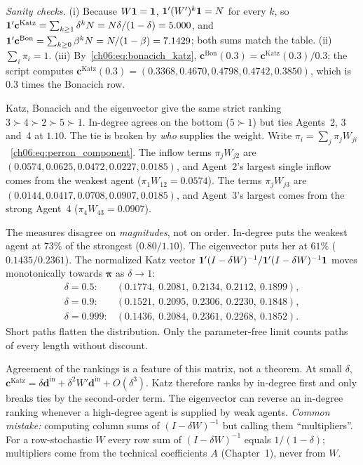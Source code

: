 \documentclass[../solutions_manual.tex]{subfiles}
\begin{document}
\emph{Sanity checks.} (i) Because $W\mathbf{1} = \mathbf{1}$, $\mathbf{1}'(W')^k\mathbf{1} = N$ for every $k$, so $\mathbf{1}'\mathbf{c}^{\text{Katz}} = \sum_{k \ge 1}\delta^k N = N\delta/(1-\delta) = 5.000$, and $\mathbf{1}'\mathbf{c}^{\text{Bon}} = \sum_{k\ge0}\beta^k N = N/(1-\beta) = 7.1429$; both sums match the table. (ii) $\sum_i \pi_i = 1$. (iii) By~\eqref{ch06:eq:bonacich_katz}, $\mathbf{c}^{\text{Bon}}(0.3) = \mathbf{c}^{\text{Katz}}(0.3)/0.3$; the script computes $\mathbf{c}^{\text{Katz}}(0.3) = (0.3368, 0.4670, 0.4798, 0.4742, 0.3850)$, which is $0.3$ times the Bonacich row.

 Katz, Bonacich and the eigenvector give the same strict ranking $3 \succ 4 \succ 2 \succ 5 \succ 1$. In-degree agrees on the bottom ($5 \succ 1$) but ties Agents~2, 3 and~4 at $1.10$. The tie is broken by \emph{who} supplies the weight. Write $\pi_i = \sum_j \pi_j W_{ji}$~\eqref{ch06:eq:perron_component}. The inflow terms $\pi_jW_{j2}$ are $(0.0574, 0.0625, 0.0472, 0.0227, 0.0185)$, and Agent~2's largest single inflow comes from the weakest agent ($\pi_1W_{12} = 0.0574$). The terms $\pi_jW_{j3}$ are $(0.0144, 0.0417, 0.0708, 0.0907, 0.0185)$, and Agent~3's largest comes from the strong Agent~4 ($\pi_4W_{43} = 0.0907$).

The measures disagree on \emph{magnitudes}, not on order. In-degree puts the weakest agent at $73\%$ of the strongest ($0.80/1.10$). The eigenvector puts her at $61\%$ ($0.1435/0.2361$). The normalized Katz vector $\mathbf{1}'(I - \delta W)^{-1}/\mathbf{1}'(I-\delta W)^{-1}\mathbf{1}$ moves monotonically towards $\boldsymbol{\pi}$ as $\delta \to 1$:
\[
\begin{array}{ll}
\delta = 0.5: & (0.1774,\ 0.2081,\ 0.2134,\ 0.2112,\ 0.1899),\\
\delta = 0.9: & (0.1521,\ 0.2095,\ 0.2306,\ 0.2230,\ 0.1848),\\
\delta = 0.999: & (0.1436,\ 0.2084,\ 0.2361,\ 0.2268,\ 0.1852).
\end{array}
\] Short paths flatten the distribution. Only the parameter-free limit counts paths of every length without discount.

Agreement of the rankings is a feature of this matrix, not a theorem. At small $\delta$, $\mathbf{c}^{\text{Katz}} = \delta\mathbf{d}^{\text{in}} + \delta^2 W'\mathbf{d}^{\text{in}} + O(\delta^3)$. Katz therefore ranks by in-degree first and only breaks ties by the second-order term. The eigenvector can reverse an in-degree ranking whenever a high-degree agent is supplied by weak agents. \emph{Common mistake:} computing column sums of $(I - \delta W)^{-1}$ but calling them ``multipliers''. For a row-stochastic $W$ every row sum of $(I-\delta W)^{-1}$ equals $1/(1-\delta)$; multipliers come from the technical coefficients $A$ (Chapter~1), never from $W$.
\end{document}
